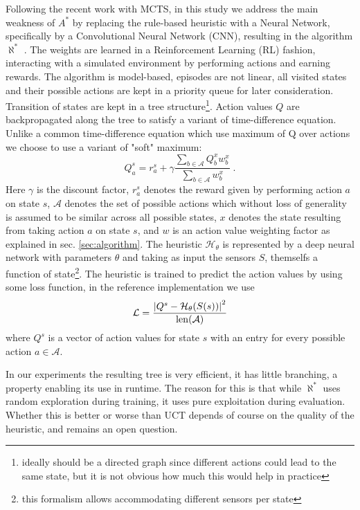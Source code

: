 \documentclass{article}
\newcommand{\alephstar}{$\aleph^*$ }
\newcommand{\astar}{$A^*$ }
\begin{document}
Following the recent work with MCTS, in this study we address the main weakness of \astar by replacing the rule-based heuristic with a Neural Network, specifically by a Convolutional Neural Network (CNN), resulting in the algorithm \alephstar. The weights are learned in a Reinforcement Learning (RL) fashion, interacting with a simulated environment by performing actions and earning rewards. The algorithm is model-based, episodes are not linear, all visited states and their possible actions are kept in a priority queue for later consideration. Transition of states are kept in a tree structure\footnote{ideally should be a directed graph since different actions could lead to the same state, but it is not obvious how much this would help in practice}. Action values $Q$ are backpropagated along the tree to satisfy a variant of time-difference equation. Unlike a common time-difference equation which use maximum of Q over actions we choose to use a variant of "soft" maximum:
\begin{equation}
  \label{eq:backprop}  
  Q^s_a = r^s_a + \gamma \frac{
    \sum_{b\in{\mathcal A}} {Q^x_b w^x_b}
  }{
    \sum_{b\in{\mathcal A}} {w^x_b}
  }\;.
\end{equation}
Here $\gamma$ is the discount factor, $r^s_a$ denotes the reward given by performing action $a$ on state $s$, ${\mathcal A}$ denotes the set of possible actions which without loss of generality is assumed to be similar across all possible states, $x$ denotes the state resulting from taking action $a$ on state $s$, and $w$ is an action value weighting factor as explained in sec. \ref{sec:algorithm}. The heuristic ${\mathcal H}_\theta$ is represented by a deep neural network with parameters $\theta$ and taking as input the sensors $S$, themselfs a function of state\footnote{this formalism allows accommodating different sensors per state}. The heuristic is trained to predict the action values by using some loss function, in the reference implementation we use 
\begin{equation}
  \mathcal{L} = \frac{\left| Q^s - {\mathcal H}_\theta(S(s)) \right|^2}{{\rm len}({\mathcal A})}
\end{equation}
where $Q^s$ is a vector of action values for state $s$ with an entry for every possible action $a \in \mathcal{A}$.

In our experiments the resulting tree is very efficient, it has little branching, a property enabling its use in runtime. The reason for this is that while \alephstar uses random exploration during training, it uses pure exploitation during evaluation. Whether this is better or worse than UCT depends of course on the quality of the heuristic, and remains an open question.
\end{document}
